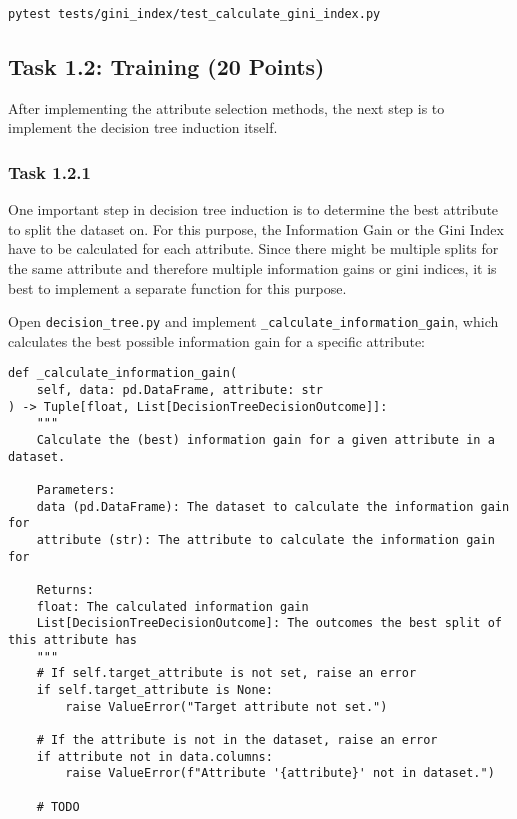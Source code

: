 \documentclass[
english,
smallborders
]{i6prcsht}
\newcommand{\points}[1]{\hfill \color{red}(#1 Points)\color{black}}
\begin{document}
\begin{lstlisting}
pytest tests/gini_index/test_calculate_gini_index.py
\end{lstlisting}

\vspace*{0.1cm}

\subsection*{Task 1.2: Training \points{20}}

After implementing the attribute selection methods, the next step is to implement the decision tree induction itself.

\subsubsection*{Task 1.2.1}

One important step in decision tree induction is to determine the best attribute to split the dataset on. For this purpose, the Information Gain or the Gini Index have to be calculated for each attribute. Since there might be multiple splits for the same attribute and therefore multiple information gains or gini indices, it is best to implement a separate function for this purpose.

Open \texttt{decision\_tree.py} and implement \texttt{\_calculate\_information\_gain}, which calculates the best possible information gain for a specific attribute:

\vspace*{0.3cm}

\begin{lstlisting}
def _calculate_information_gain(
	self, data: pd.DataFrame, attribute: str
) -> Tuple[float, List[DecisionTreeDecisionOutcome]]:
	"""
	Calculate the (best) information gain for a given attribute in a dataset.

	Parameters:
	data (pd.DataFrame): The dataset to calculate the information gain for
	attribute (str): The attribute to calculate the information gain for

	Returns:
	float: The calculated information gain
	List[DecisionTreeDecisionOutcome]: The outcomes the best split of this attribute has
	"""
	# If self.target_attribute is not set, raise an error
	if self.target_attribute is None:
		raise ValueError("Target attribute not set.")

	# If the attribute is not in the dataset, raise an error
	if attribute not in data.columns:
		raise ValueError(f"Attribute '{attribute}' not in dataset.")

	# TODO
\end{lstlisting}
\end{document}
